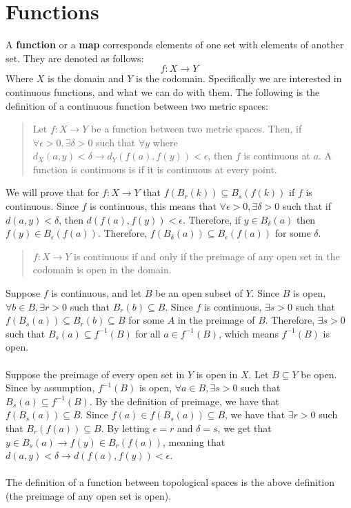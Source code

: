 \documentclass[12pt]{extarticle}
\begin{document}
\section*{Functions}%
A \textbf{function} or a \textbf{map} corresponds elements of one set with elements of another set. They are denoted as follows:
\[
  f: X\rightarrow Y
\]
Where $X$ is the domain and $Y$ is the codomain. Specifically we are interested in continuous functions, and what we can do with them. The following is the definition of a continuous function between two metric spaces:
   \begin{quote}
     Let $f: X\rightarrow Y$ be a function between two metric spaces. Then, if $\forall \epsilon>0, \exists \delta>0$ such that $\forall y$ where $d_{X}(a,y)< \delta \rightarrow d_{Y}(f(a),f(y))<\epsilon$, then $f$ is continuous at $a$. A function is continuous is if it is continuous at every point.
   \end{quote}
We will prove that for $f: X\rightarrow Y$ that $f(B_{r}(k))\subseteq B_{s}(f(k))$ if $f$ is continuous. Since $f$ is continuous, this means that $\forall \epsilon>0, \exists \delta>0$ such that if $d(a,y)<\delta$, then $d(f(a),f(y))<\epsilon$. Therefore, if $y\in B_{\delta}(a)$ then $f(y)\in B_{\epsilon}(f(a))$. Therefore, $f(B_{\delta}(a))\subseteq B_{\epsilon}(f(a))$ for some $\delta$.
     \begin{quote}
       $f:X\rightarrow Y$ is continuous if and only if the preimage of any open set in the codomain is open in the domain.
     \end{quote}
Suppose $f$ is continuous, and let $B$ be an open subset of $Y$. Since $B$ is open, $\forall b\in B, \exists r>0$ such that $B_{r}(b)\subseteq B$. Since $f$ is continuous, $\exists s>0$ such that $f(B_{s}(a))\subseteq B_{r}(b)\subseteq B$ for some $A$ in the preimage of $B$. Therefore, $\exists s>0$ such that $B_{s}(a)\subseteq f^{-1}(B)$ for all $a\in f^{-1}(B)$, which means $f^{-1}(B)$ is open.\\
     \\
Suppose the preimage of every open set in $Y$ is open in $X$. Let $B\subseteq Y$ be open. Since by assumption, $f^{-1}(B)$ is open, $\forall a\in B, \exists s>0$ such that $B_{s}(a)\subseteq f^{-1}(B)$. By the definition of preimage, we have that $f(B_{s}(a))\subseteq B$. Since $f(a)\in f(B_{s}(a))\subseteq B$, we have that $\exists r>0$ such that $B_{r}(f(a))\subseteq B$. By letting $\epsilon = r$ and $\delta = s$, we get that $y\in B_{s}(a)\rightarrow f(y)\in B_{r}(f(a))$, meaning that $d(a,y)<\delta\rightarrow d(f(a),f(y))<\epsilon$.\\
\\
The definition of a function between topological spaces is the above definition (the preimage of any open set is open).
\end{document}
